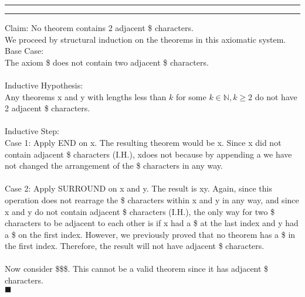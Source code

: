 \documentclass[11pt]{article}
\newcounter{questionCounter}
\newcounter{partCounter}[questionCounter]
\newenvironment{question}[2][\arabic{questionCounter}]{%
    \setcounter{partCounter}{0}%
    \vspace{.25in} \hrule \vspace{0.5em}%
        \noindent{\bf #2}%
    \vspace{0.8em} \hrule \vspace{.10in}%
    \addtocounter{questionCounter}{1}%
}{}
\begin{document}
\begin{question}{Theorem? I hardly knew him!}
Claim: No theorem contains 2 adjacent \$ characters.\\
We proceed by structural induction on the theorems in this axiomatic system.
\\
Base Case:\\
The axiom \textbar \$ does not contain two adjacent \$ characters.\\
\\
Inductive Hypothesis:\\
Any theorems x and y with lengths less than $k$ for some $k \in \mathbb{N}, k\geq 2$ do not have 2 adjacent \$ characters.\\
\\
Inductive Step:\\
Case 1: Apply END on x. The resulting theorem would be x\textbar. Since x did not contain adjacent \$ characters (I.H.), x\textbar does not because by appending a \textbar we have not changed the arrangement of the \$ characters in any way.\\
\\
Case 2: Apply SURROUND on x and y. The result is \textbar xy\textbar. Again, since this operation does not rearrage the \$ characters within x and y in any way, and since x and y do not contain adjacent \$ characters (I.H.), the only way for two \$ characters to be adjacent to each other is if x had a \$ at the last index and y had a \$ on the first index. However, we previously proved that no theorem has a \$ in the first index. Therefore, the result will not have adjacent \$ characters.\\
\\
Now consider \textbar\textbar\$\textbar\textbar\textbar\$\$\textbar. This cannot be a valid theorem since it has adjacent \$ characters.\\
$\blacksquare$


\end{question}
\end{document}

